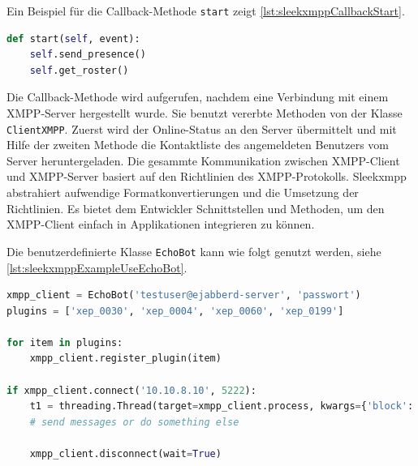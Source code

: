 \documentclass[a4paper,titlepage,halfparskip,12pt]{scrreprt}
\begin{document}
\begin{onehalfspacing}
Ein Beispiel für die Callback-Methode \texttt{start} zeigt \autoref{lst:sleekxmppCallbackStart}.

\begin{lstlisting}[language=python, caption={Beispiel: Callback-Methode des Moduls sleekxmpp}, label={lst:sleekxmppCallbackStart}]
def start(self, event):
    self.send_presence()
    self.get_roster()
\end{lstlisting}

Die Callback-Methode wird aufgerufen, nachdem eine Verbindung mit einem \acs{XMPP}-Server hergestellt wurde. Sie benutzt vererbte Methoden von der Klasse \texttt{ClientXMPP}. Zuerst wird der Online-Status an den Server übermittelt und mit Hilfe der zweiten Methode die Kontaktliste des angemeldeten Benutzers vom Server heruntergeladen. Die gesammte Kommunikation zwischen \acs{XMPP}-Client und \acs{XMPP}-Server basiert auf den Richtlinien des \acs{XMPP}-Protokolls. Sleekxmpp abstrahiert aufwendige Formatkonvertierungen und die Umsetzung der Richtlinien. Es bietet dem Entwickler Schnittstellen und Methoden, um den \acs{XMPP}-Client einfach in Applikationen integrieren zu können.

Die benutzerdefinierte Klasse \texttt{EchoBot} kann wie folgt genutzt werden, siehe \autoref{lst:sleekxmppExampleUseEchoBot}.

\begin{lstlisting}[language=python, caption={Beispiel: Aufbau einer Verbindung zu einem \acs{XMPP}-Server mit sleekxmpp}, label={lst:sleekxmppExampleUseEchoBot}]
xmpp_client = EchoBot('testuser@ejabberd-server', 'passwort')
plugins = ['xep_0030', 'xep_0004', 'xep_0060', 'xep_0199']

for item in plugins:
    xmpp_client.register_plugin(item)

if xmpp_client.connect('10.10.8.10', 5222):
    t1 = threading.Thread(target=xmpp_client.process, kwargs={'block': True}, deamon=True)
    # send messages or do something else
    
    xmpp_client.disconnect(wait=True)
\end{lstlisting}


\end{onehalfspacing}
\end{document}
